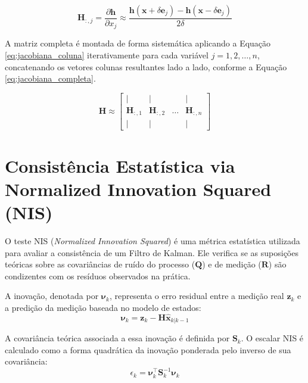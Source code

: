 \documentclass[journal]{IEEEtran}
\begin{document}
\begin{appendices}
\begin{equation}
    \label{eq:jacobiana_coluna}
    \mathbf{H}_{:, j} = \frac{\partial \mathbf{h}}{\partial x_j} \approx \frac{\mathbf{h}(\mathbf{x} + \delta \mathbf{e}_j) - \mathbf{h}(\mathbf{x} - \delta \mathbf{e}_j)}{2\delta}
\end{equation}

A matriz completa é montada de forma sistemática aplicando a Equação \eqref{eq:jacobiana_coluna} iterativamente para cada variável $j = 1, 2, \dots, n$, concatenando os vetores colunas resultantes lado a lado, conforme a Equação \eqref{eq:jacobiana_completa}.

\begin{equation}
    \label{eq:jacobiana_completa}
    \mathbf{H} \approx \begin{bmatrix}
        | & | & & | \\
        \mathbf{H}_{:, 1} & \mathbf{H}_{:, 2} & \dots & \mathbf{H}_{:, n} \\
        | & | & & |
    \end{bmatrix}
\end{equation}

\section{Consistência Estatística via Normalized Innovation Squared (NIS)}
\label{app:NIS}

O teste NIS (\textit{Normalized Innovation Squared}) é uma métrica estatística utilizada para avaliar a consistência de um Filtro de Kalman. Ele verifica se as suposições teóricas sobre as covariâncias de ruído do processo ($\mathbf{Q}$) e de medição ($\mathbf{R}$) são condizentes com os resíduos observados na prática.

A inovação, denotada por $\boldsymbol{\nu}_k$, representa o erro residual entre a medição real $\mathbf{z}_k$ e a predição da medição baseada no modelo de estados:
\begin{equation}
    \boldsymbol{\nu}_k = \mathbf{z}_k - \mathbf{H}\hat{\mathbf{x}}_{k|k-1}
\end{equation}

A covariância teórica associada a essa inovação é definida por $\mathbf{S}_k$. O escalar NIS é calculado como a forma quadrática da inovação ponderada pelo inverso de sua covariância:
\begin{equation}
    \label{eq:calculo_nis}
    \epsilon_k = \boldsymbol{\nu}_k^\top \mathbf{S}_k^{-1} \boldsymbol{\nu}_k
\end{equation}


\end{appendices}
\end{document}
